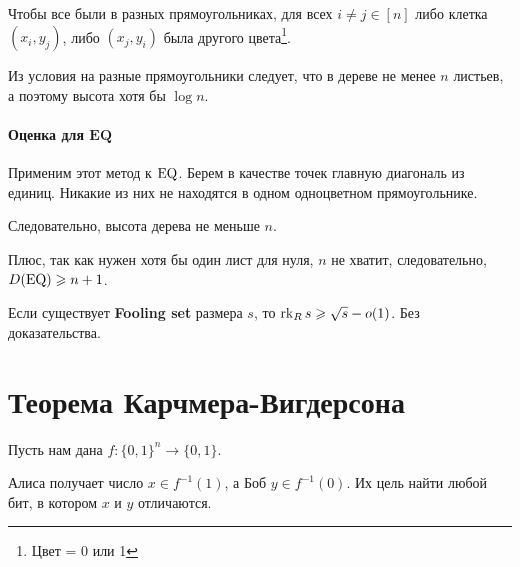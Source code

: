 Чтобы все были в разных прямоугольниках, для всех $ i \ne j \in [n]$ либо клетка $ (x_i, y_j)$, либо  $ (x_j, y_i)$ была  другого цвета\footnote{Цвет = 0 или 1}.

Из условия  на разные прямоугольники следует, что в дереве не менее $ n$ листьев, а поэтому высота хотя бы  $  \log n$.

\paragraph{Оценка для $\mathbf{EQ}$}
Применим этот метод к $ \operatorname{EQ}$. Берем в качестве точек главную диагональ из единиц. Никакие из них не находятся в одном одноцветном прямоугольнике. 

Следовательно, высота дерева не меньше $ n$.

Плюс, так как нужен хотя бы один лист для нуля, $ n$ не хватит, следовательно,  $ D(\operatorname{EQ}) \geqslant n+1$.

\begin{thm}
	Если существует \textbf{Fooling set} размера $ s$, то $ \operatorname{rk}_R s \geqslant \sqrt{ s} - o(1) $.
	Без доказательства.
\end{thm}



\section{Теорема Карчмера-Вигдерсона}

Пусть нам дана $ f\colon \{0, 1\}^{n } \to  \{0, 1\}$.

Алиса получает число $ x \in f^{-1}(1)$, а Боб $ y \in f^{-1}(0)$. Их цель найти любой бит, в котором $x$ и $y$ отличаются.

